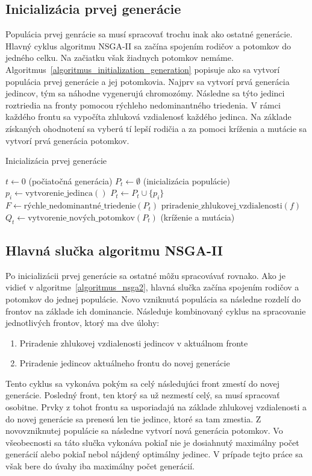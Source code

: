 \subsection*{Inicializácia prvej generácie}
Populácia prvej genrácie sa musí spracovať trochu inak ako ostatné generácie.
Hlavný cyklus algoritmu NSGA-II sa začína spojením rodičov a potomkov do jedného celku.
Na začiatku však žiadnych potomkov nemáme.
Algoritmus~\ref{algoritmus_initialization_generation} popisuje ako sa vytvorí populácia prvej generácie a jej potomkovia.
Najprv sa vytvorí prvá generácia jedincov, tým sa náhodne vygenerujú chromozómy.
Následne sa týto jedinci roztriedia na fronty pomocou rýchleho nedominantného triedenia.
V rámci každého frontu sa vypočíta zhluková vzdialenosť každého jedinca.
Na základe získaných ohodnotení sa vyberú tí lepší rodičia a za pomoci kríženia a mutácie sa vytvorí prvá generácia potomkov.

\vspace*{\dimexpr0.5\baselineskip\relax}
\begin{algorithm}[h]\label{algoritmus_initialization_generation}
\caption{Inicializácia prvej generácie}
  $t \gets 0$ (počiatočná generácia)\;
  $P_t \gets \emptyset$ (inicializácia populácie)\;
   {
    $p_i \gets \text{vytvorenie\_jedinca}()$\;
    $P_t \gets P_t \cup \{p_i\}$\;
  }
  $F \gets \text{rýchle\_nedominantné\_triedenie}(P_t)$\;
   {
    $\text{priradenie\_zhlukovej\_vzdialenosti}(f)$\;
  }
  $Q_t \gets \text{vytvorenie\_nových\_potomkov}(P_t)$ (kríženie a mutácia)\;
\end{algorithm}

\subsection*{Hlavná slučka algoritmu NSGA-II}
Po inicializácii prvej generácie sa ostatné môžu spracovávať rovnako.
Ako je vidieť v algoritme~\ref{algoritmus_nsga2}, hlavná slučka začína spojením rodičov a potomkov do jednej populácie.
Novo vzniknutá populácia sa následne rozdelí do frontov na základe ich dominancie.
Následuje kombinovaný cyklus na spracovanie jednotlivých frontov, ktorý ma dve úlohy:
\begin{enumerate}
  \item Priradenie zhlukovej vzdialenosti jedincov v aktuálnom fronte
  \item Priradenie jedincov aktuálneho frontu do novej generácie
\end{enumerate}
Tento cyklus sa vykonáva pokým sa celý následujúci front zmestí do novej generácie.
Posledný front, ten ktorý sa už nezmestí celý, sa musí spracovať osobitne.
Prvky z tohot frontu sa usporiadajú na základe zhlukovej vzdialenosti a do novej generácie sa prenesú len tie jedince, ktoré sa tam zmestia.
Z novovzniknutej populácie sa následne vytvorí nová generácia potomkov.
Vo všeobecnosti sa táto slučka vykonáva pokiaľ nie je dosiahnutý maximálny počet generácií alebo pokiaľ nebol nájdený optimálny jedinec.
V prípade tejto práce sa však bere do úvahy iba maximálny počet generácií.

